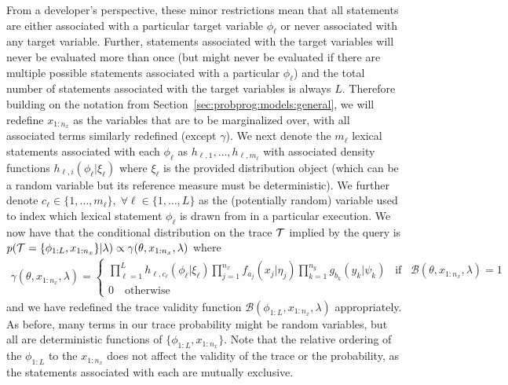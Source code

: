 From a developer's perspective, these minor restrictions mean that all \sample statements are
either associated with a particular target variable $\phi_{\ell}$ or never associated with any target 
variable. Further, \sample
statements associated with the target variables will never be evaluated more than once (but might never
be evaluated if there are multiple possible \sample statements associated with a particular $\phi_{\ell}$) and
the total number of \sample statements associated with the target variables is always $L$.
Therefore building on the notation from Section~\ref{sec:probprog:models:general}, we will redefine $x_{1:n_x}$
as the variables that are to be marginalized over, with all associated terms similarly redefined (except $\gamma$).
We next denote the $m_{\ell}$ lexical \sample statements associated with each $\phi_{\ell}$ as 
$h_{\ell,1},\dots,h_{\ell,m_{\ell}}$ with associated density functions $h_{\ell,i}(\phi_{\ell} | \xi_{\ell})$ where
$\xi_{\ell}$ is the provided distribution object (which can be a random variable but its reference measure
must be deterministic).  We further denote $c_{\ell} \in \{1,\dots,m_{\ell}\}, \; 
\forall \ell \in \{1,\dots,L\}$ as the (potentially random) variable used to index which lexical \sample statement
$\phi_{\ell}$ is drawn from in a particular execution.  We now have that the conditional distribution on the trace $\mathcal{T}$ implied
by the query is $p(\mathcal{T} = \{\phi_{1:L},x_{1:n_x}\} | \lambda) \propto \gamma(\theta,x_{1:n_x}, \lambda)$
where
\begin{align}
\label{eq:bopp:joint}
\gamma(\theta,x_{1:n_x}, \lambda) = \begin{cases}
\prod_{\ell=1}^{L}
h_{\ell,c_{\ell}} (\phi_{\ell} | \xi_{\ell})
\prod_{j=1}^{n_x} 
f_{a_j}(x_j | \eta_j)
\prod_{k=1}^{n_y}
g_{b_k}(y_k | \psi_k) \;\;\; \text{if} \;\;\; \mathcal{B}(\theta,x_{1:n_x},\lambda)=1 \\
0 \quad \text{otherwise}
\end{cases}
\end{align}
and we have redefined the trace validity function $\mathcal{B}(\phi_{1:L},x_{1:n_x},\lambda)$ appropriately.
As before, many terms in our trace probability might be random variables, but all are deterministic
functions of $\{\phi_{1:L},x_{1:n_x}\}$.  Note that the relative ordering of the $\phi_{1:L}$ to the $x_{1:n_x}$
does not affect the validity of the trace or the probability, as the \sample statements associated with
each are mutually exclusive.

